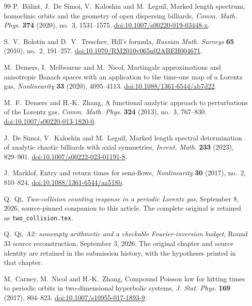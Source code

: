 \begin{thebibliography}{99}
P.~B\'alint, J.~De Simoi, V.~Kaloshin and M.~Leguil,
Marked length spectrum, homoclinic orbits and the geometry of open
dispersing billiards, \emph{Comm. Math. Phys.} \textbf{374} (2020),
no.~3, 1531--1575.
\href{https://doi.org/10.1007/s00220-019-03448-x}{doi:10.1007/s00220-019-03448-x}.

S.~V.~Bolotin and D.~V.~Treschev, Hill's formula,
\emph{Russian Math. Surveys} \textbf{65} (2010), no.~2, 191--257.
\href{https://doi.org/10.1070/RM2010v065n02ABEH004671}{doi:10.1070/RM2010v065n02ABEH004671}.

M.~Demers, I.~Melbourne and M.~Nicol, Martingale approximations and
anisotropic Banach spaces with an application to the time-one map of a
Lorentz gas, \emph{Nonlinearity} \textbf{33} (2020), 4095--4113.
\href{https://doi.org/10.1088/1361-6544/ab7d22}{doi:10.1088/1361-6544/ab7d22}.

M.~F.~Demers and H.-K.~Zhang, A functional analytic approach to
perturbations of the Lorentz gas, \emph{Comm. Math. Phys.}
\textbf{324} (2013), no.~3, 767--830.
\href{https://doi.org/10.1007/s00220-013-1820-0}{doi:10.1007/s00220-013-1820-0}.

J.~De Simoi, V.~Kaloshin and M.~Leguil, Marked length spectral
determination of analytic chaotic billiards with axial symmetries,
\emph{Invent. Math.} \textbf{233} (2023), 829--901.
\href{https://doi.org/10.1007/s00222-023-01191-8}{doi:10.1007/s00222-023-01191-8}.

J.~Marklof, Entry and return times for semi-flows,
\emph{Nonlinearity} \textbf{30} (2017), no.~2, 810--824.
\href{https://doi.org/10.1088/1361-6544/aa518b}{doi:10.1088/1361-6544/aa518b}.

Q.~Qi, \emph{Two-collision counting response in a periodic Lorentz gas},
September 8, 2026, source-pinned companion to this article.
The complete original is retained as \texttt{two\_collision.tex}.

Q.~Qi, \emph{A2: nonempty arithmetic and a checkable Fourier-inversion
budget}, Round 33 source reconstruction, September 3, 2026.
The original chapter and source identity are retained in the submission
history, with the hypotheses printed in that chapter.

M.~Carney, M.~Nicol and H.-K.~Zhang, Compound Poisson law for hitting
times to periodic orbits in two-dimensional hyperbolic systems,
\emph{J. Stat. Phys.} \textbf{169} (2017), 804--823.
\href{https://doi.org/10.1007/s10955-017-1893-9}{doi:10.1007/s10955-017-1893-9}.


\end{thebibliography}
